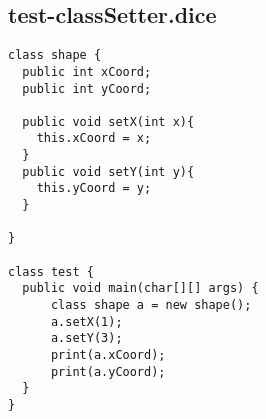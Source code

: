 \subsection{test-classSetter.dice}
\begin{verbatim}
class shape {
  public int xCoord;
  public int yCoord;

  public void setX(int x){
  	this.xCoord = x;
  }
  public void setY(int y){
   	this.yCoord = y;
  }

}

class test {
  public void main(char[][] args) {
      class shape a = new shape(); 
      a.setX(1);
      a.setY(3);
      print(a.xCoord);
      print(a.yCoord);
  }
}
\end{verbatim}
